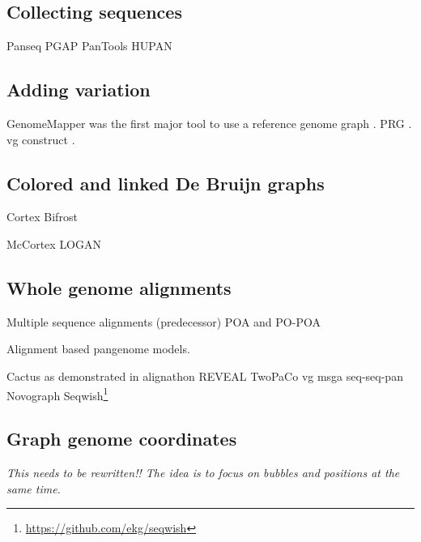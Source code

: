 \subsection{Collecting sequences}

Panseq \cite{Laing_2010}
PGAP \cite{Zhao_2011}
PanTools  \cite{Sheikhizadeh_Anari_2018}
HUPAN \citep{Duan_2019}

\subsection{Adding variation}

GenomeMapper was the first major tool to use a reference genome graph \cite{Schneeberger_2009}.
PRG \cite{dilthey2015improved}.
vg construct \cite{Garrison_2018}.

\subsection{Colored and linked De Bruijn graphs}

Cortex \cite{Iqbal_2012}
Bifrost \cite{holley2019bifrost}

McCortex \cite{Turner_2018}
LOGAN \cite{Bolger_2017}

\subsection{Whole genome alignments}

Multiple sequence alignments (predecessor) POA and PO-POA \cite{Lee_2002,Grasso_2004} %

Alignment based pangenome models.

Cactus \cite{Paten_2011} as demonstrated in alignathon \cite{earl2014alignathon}
REVEAL \cite{linthorst2015scalable}
TwoPaCo \cite{Minkin_2016}
vg msga \cite{Novak_2017a,Garrison_2018,Garrison_2019}
seq-seq-pan \cite{Jandrasits_2018}
Novograph \cite{Biederstedt2018}
Seqwish\footnote{\url{https://github.com/ekg/seqwish}} \cite{Garrison_2019}


\subsection{Graph genome coordinates}

\textit{This needs to be rewritten!! The idea is to focus on bubbles and positions at the same time.} \cite{Rand_2016}

